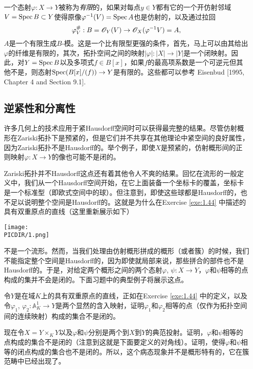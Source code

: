 一个态射$\varphi:X\to Y$被称为\textit{有限}的，如果对每点$y\in Y$都有它的一个开仿射邻域$V=\operatorname{Spec} B\subset Y$使得原像$\varphi^{-1}(V)=\operatorname{Spec} A$也是仿射的，以及通过拉回
\[
	\varphi_V^\#: B =\mathscr{O}_Y(V)\to \mathscr{O}_X(\varphi^{-1}V)=A,
\]
$A$是一个有限生成$B$-模。这是一个比有限型更强的条件，首先，马上可以由其给出$\varphi$的纤维是有限的，其次，拓扑空间之间的映射$|\varphi|:|X|\to |Y|$是一个闭映射。因此，对$Y=\operatorname{Spec} B$以及多项式$f\in B[x]$，如果$f$的最高项系数是一个可逆元但其他不是，则态射$\operatorname{Spec}(B[x]/(f))\to Y$是有限的。这些都可以参考 Eisenbud [1995, Chapter 4 and Section 9.1].

\subsection{逆紧性和分离性}\label{s:3.1.2}

许多几何上的技术应用于紧Hausdorff空间时可以获得最完整的结果。尽管仿射概形在Zariski拓扑下是预紧的，但是它们并不共享在其他理论中紧空间的良好属性，因为Zariski拓扑不是Hausdorff的。举个例子，即使$X$是预紧的，仿射概形间的正则映射$\varphi:X\to Y$的像也可能不是闭的。

Zariski拓扑并不Hausdorff这点还有着其他令人不爽的结果。回忆在流形的一般定义中，我们从一个Hausdorff空间开始，在它上面装备一个坐标卡的覆盖，坐标卡是一个标准型（即欧式空间中的球）。但注意到，即使这些球都是Hausdorff的，也不足以说明整个空间是Hausdorff的。这就是为什么在Exercise \ref{exe:1.44} 中描述的具有双重原点的直线（这里重新展示如下）

\begin{center}\texttt{[image: \\PICDIR/1.png]}\end{center}

\vspace{-0.4em}\noindent 不是一个流形。然而，当我们处理由仿射概形拼成的概形（或者簇）的时候，我们不能指定整个空间是Hausdorff的，因为即使就局部来说，那些拼合的部件也不是Hausdorff的。于是，对给定两个概形之间的两个态射$\varphi$, $\psi:X\to Y$，$\varphi$和$\psi$相等的点构成的集并不会是闭的。下面习题中的典型例子将展示这点。

\begin{exe}
\begin{compactenum}[(a)]
\item 令$Y$是在域$K$上的具有双重原点的直线，正如在Exercise \ref{exe:1.44} 中的定义，以及令$\varphi_1$, $\varphi_2:\mathbb{A}_K^1\to Y$是两个显然的含入映射，证明$\varphi_1$和$\varphi_2$相等的点（仅作为拓扑空间间的连续映射）构成的集合不是闭的。
\item 现在令$X=Y\times_K Y$以及$\varphi$和$\psi$分别是两个到$X$到$Y$的典范投射。证明，$\varphi$和$\psi$相等的点构成的集合不是闭的（注意到这就是下面要定义的对角线）。证明，使得$\varphi$和$\psi$相等的闭点构成的集合也不是闭的。所以，这个病态现象并不是概形特有的，它在簇范畴中已经出现了。
\end{compactenum}
\end{exe}


